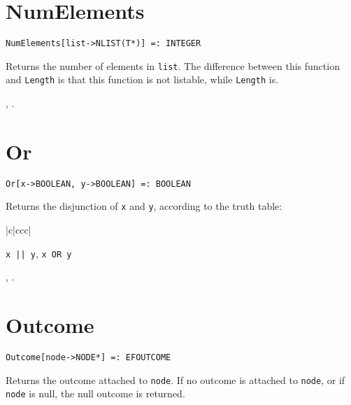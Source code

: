 \section*{NumElements}\label{PrimNumElements}
\begin{verbatim}
NumElements[list->NLIST(T*)] =: INTEGER 
\end{verbatim}
\foralltypes

\noindent
Returns the number of elements in \verb+list+.  The difference between
this function and \verb+Length+ is that this function is not listable,
while \verb+Length+ is.  

\seealso {}, .


\section*{Or}\label{PrimOr}
\begin{verbatim}
Or[x->BOOLEAN, y->BOOLEAN] =: BOOLEAN 
\end{verbatim} 
  
\noindent Returns the disjunction of \verb+x+ and \verb+y+, according to the truth
table:
\begin{center}
\begin{tabular}{|c|ccc|} \hline
{}
\end{tabular}
\end{center}

\shortform \verb+x || y+, \verb+x OR y+

\seealso {}, .


\section*{Outcome}\label{PrimOutcome}
\begin{verbatim}
Outcome[node->NODE*] =: EFOUTCOME 
\end{verbatim}

\noindent
Returns the outcome attached to \verb+node+.  If no outcome is attached
to \verb+node+, or if \verb+node+ is null, the null outcome is returned.

